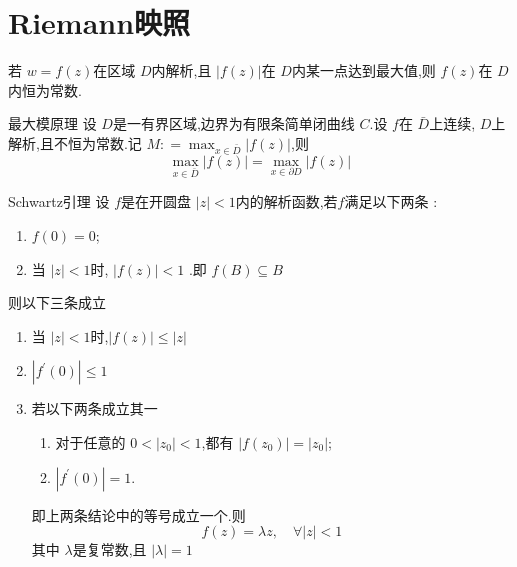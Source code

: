 \documentclass[../../复变函数.tex]{subfiles}
\begin{document}
\section{Riemann映照}


\begin{theorem}
    若 \(  w= f\left( z \right)   \)在区域 \(  D  \)内解析,且 \(  \left| f\left( z \right)  \right|   \)在 \(  D  \)内某一点达到最大值,则 \(  f\left( z \right)   \)在 \(  D  \)内恒为常数.      
\end{theorem}


\begin{theorem}{最大模原理}
    设 \(  D  \)是一有界区域,边界为有限条简单闭曲线 \(  C  \).设 \(  f  \)在 \(  \bar{D}  \)上连续, \(  D  \)上解析,且不恒为常数.记 \(  M: =  \max _{x\in \bar{D}} \left| f\left( z \right)  \right|   \),则 \[
    \max _{x\in \bar{D}}\left| f\left( z \right)  \right|= \max _{x\in  \partial D}\left| f\left( z \right)  \right|  
    \]      
\end{theorem}


\begin{theorem}{Schwartz引理}
    设 \(  f  \)是在开圆盘 \(  \left| z \right|< 1   \)内的解析函数,若\(  f  \)满足以下两条 :
    \begin{enumerate}
        \item \(  f\left( 0 \right)= 0   \);
        \item 当 \(  \left| z \right|< 1   \)时, \(  \left| f\left( z \right)  \right|< 1   \)  .即 \(  f\left( B \right)\subseteq B   \)  
    \end{enumerate}
    则以下三条成立
    \begin{enumerate}
        \item 当 \(  \left| z \right|< 1   \)时,\(  \left| f\left( z \right)  \right|\le \left| z \right|    \)
        \item \(  \left| f^{\prime} \left( 0 \right)  \right|\le 1   \)
        \item 若以下两条成立其一
     \begin{enumerate}
            \item 对于任意的 \(  0< \left| z_0 \right|< 1   \),都有 \(  \left| f\left( z_0 \right)  \right|= \left| z_0 \right|    \);
            \item \(  \left| f^{\prime} \left( 0 \right)  \right|= 1   \). 
        \end{enumerate}
             即上两条结论中的等号成立一个.则 \[
             f\left( z \right)=  \lambda z ,\quad \forall \left| z \right|< 1 
             \]其中 \(   \lambda   \)是复常数,且 \(  \left|  \lambda  \right|= 1   \)  
    \end{enumerate}
    
      
\end{theorem}
\end{document}
